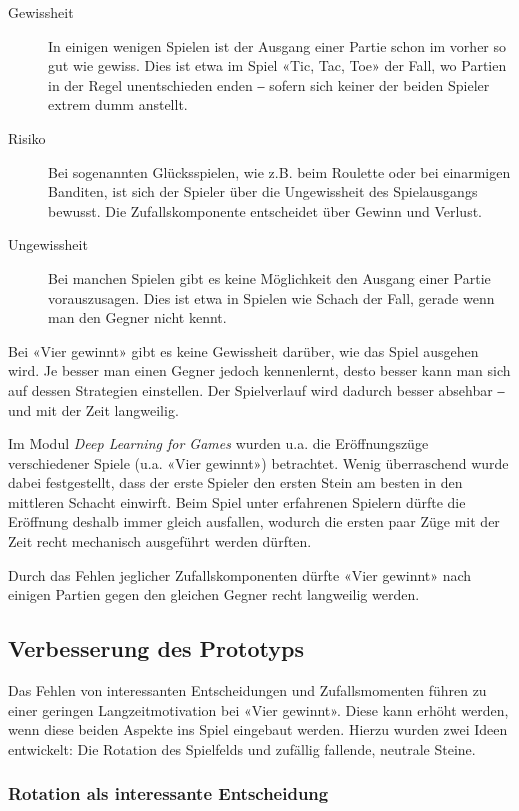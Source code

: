 \documentclass[a4paper,11pt,hidelinks]{scrartcl}
\begin{document}
\begin{description}
    \item[Gewissheit] In einigen wenigen Spielen ist der Ausgang einer Partie schon im vorher so gut wie gewiss. Dies ist etwa im Spiel «Tic, Tac, Toe» der Fall, wo Partien in der Regel unentschieden enden ‒ sofern sich keiner der beiden Spieler extrem dumm anstellt.
    \item[Risiko] Bei sogenannten Glücksspielen, wie z.B. beim Roulette oder bei einarmigen Banditen, ist sich der Spieler über die Ungewissheit des Spielausgangs bewusst. Die Zufallskomponente entscheidet über Gewinn und Verlust.
    \item[Ungewissheit] Bei manchen Spielen gibt es keine Möglichkeit den Ausgang einer Partie vorauszusagen. Dies ist etwa in Spielen wie Schach der Fall, gerade wenn man den Gegner nicht kennt.
\end{description}

Bei «Vier gewinnt» gibt es keine Gewissheit darüber, wie das Spiel ausgehen wird. Je besser man einen Gegner jedoch kennenlernt, desto besser kann man sich auf dessen Strategien einstellen. Der Spielverlauf wird dadurch besser absehbar ‒ und mit der Zeit langweilig.

Im Modul \textit{Deep Learning for Games} wurden u.a. die Eröffnungszüge verschiedener Spiele (u.a. «Vier gewinnt») betrachtet. Wenig überraschend wurde dabei festgestellt, dass der erste Spieler den ersten Stein am besten in den mittleren Schacht einwirft. Beim Spiel unter erfahrenen Spielern dürfte die Eröffnung deshalb immer gleich ausfallen, wodurch die ersten paar Züge mit der Zeit recht mechanisch ausgeführt werden dürften.

Durch das Fehlen jeglicher Zufallskomponenten dürfte «Vier gewinnt» nach einigen Partien gegen den gleichen Gegner recht langweilig werden.

\subsection{Verbesserung des Prototyps}

Das Fehlen von interessanten Entscheidungen und Zufallsmomenten führen zu einer geringen Langzeitmotivation bei «Vier gewinnt». Diese kann erhöht werden, wenn diese beiden Aspekte ins Spiel eingebaut werden. Hierzu wurden zwei Ideen entwickelt: Die Rotation des Spielfelds und zufällig fallende, neutrale Steine.

\subsubsection{Rotation als interessante Entscheidung}
\end{document}
